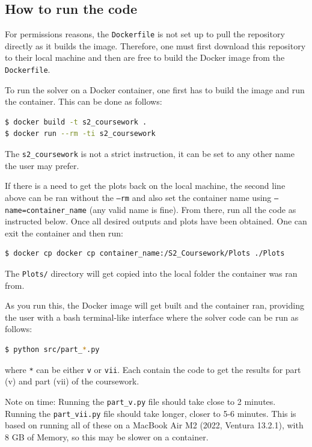 \documentclass[12pt]{report} %
\begin{document}
\subsection{How to run the code}
For permissions reasons, the \texttt{Dockerfile} is not set up to pull the repository directly as it builds the image. Therefore, one must first download this repository to their local machine and then are free to build the Docker image from the \texttt{Dockerfile}.

To run the solver on a Docker container, one first has to build the image and run the container. This can be done as follows:

\begin{lstlisting}[language=bash]
$ docker build -t s2_coursework .
$ docker run --rm -ti s2_coursework
\end{lstlisting}

The \texttt{s2\_coursework} is not a strict instruction, it can be set to any other name the user may prefer.

If there is a need to get the plots back on the local machine, the second line above can be ran without the \texttt{--rm} and also set the container name using \texttt{--name=container\_name} (any valid name is fine). From there, run all the code as instructed below. Once all desired outputs and plots have been obtained. One can exit the container and then run:

\begin{lstlisting}[language=bash]
$ docker cp docker cp container_name:/S2_Coursework/Plots ./Plots
\end{lstlisting}

The \texttt{Plots/} directory will get copied into the local folder the container was ran from.

As you run this, the Docker image will get built and the container ran, providing the user with a bash terminal-like interface where the solver code can be run as follows:

\begin{lstlisting}[language=bash]
$ python src/part_*.py
\end{lstlisting}

where \texttt{*} can be either \texttt{v} or \texttt{vii}. Each contain the code to get the results for part (v) and part (vii) of the coursework.

Note on time: Running the \texttt{part\_v.py} file should take close to 2 minutes. Running the \texttt{part\_vii.py} file should take longer, closer to 5-6 minutes. This is based on running all of these on a MacBook Air M2 (2022, Ventura 13.2.1), with 8 GB of Memory, so this may be slower on a container.
\end{document}

